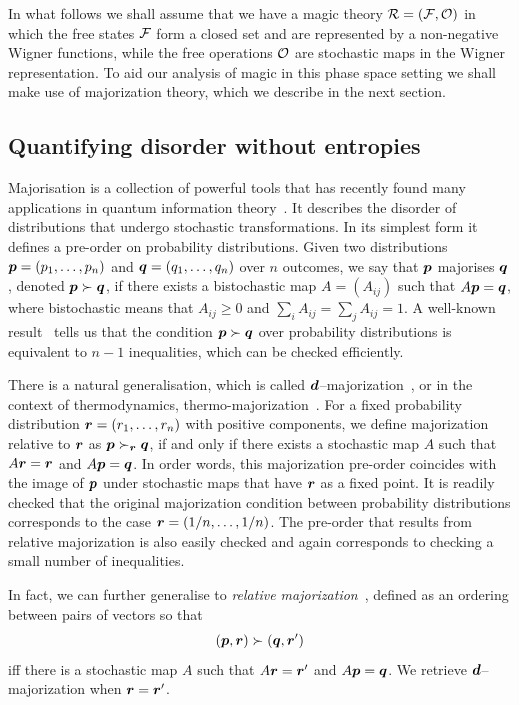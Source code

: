 \documentclass[pra,
aps,
twocolumn,
superscriptaddress,
groupedaddress,
nofootinbib,
reprint
]{revtex4-1}
\begin{document}
In what follows we shall assume that we have a magic theory ${\mathcal R} = ({\mathcal F}, {\mathcal O})$ in which the free states ${\mathcal F}$ form a closed set and are represented by a non-negative Wigner functions, while the free operations ${\mathcal O}$ are stochastic maps in the Wigner representation. To aid our analysis of magic in this phase space setting we shall make use of majorization theory, which we describe in the next section.



\subsection{Quantifying disorder without entropies}
\label{sec:major}

Majorisation is a collection of powerful tools that has recently found many applications in quantum information theory~\cite{Nielsen_1999, cit:cwiklinski, cit:lostaglio2, cit:gour, cit:gour2, Horodecki_2003, Vallejos_2021}.
It describes the disorder of distributions that undergo stochastic transformations. In its simplest form it defines a pre-order on probability distributions. Given two distributions $\boldsymbol{p}= (p_1, \dots, p_n)$ and $\boldsymbol{q} = (q_1, \dots, q_n)$ over $n$ outcomes, we say that $\boldsymbol{p}$ majorises $\boldsymbol{q}$, denoted $\boldsymbol{p} \succ \boldsymbol{q}$, if there exists a bistochastic map $A = (A_{ij})$ such that $A\boldsymbol{p} = \boldsymbol{q}$, where bistochastic means that $A_{ij} \geq 0$ and $\sum_i A_{ij} = \sum_j A_{ij} = 1$. A well-known result~\cite{cit:marshall} tells us that the condition $ \boldsymbol{p} \succ \boldsymbol{q}$ over probability distributions is equivalent to $n-1$ inequalities, which can be checked efficiently.

There is a natural generalisation, which is called $\bm{d}$--majorization~\cite{Veinott_1971}, or in the context of thermodynamics, thermo-majorization~\cite{cit:horodecki2013}. For a fixed probability distribution $\boldsymbol{r} = (r_1, \dots, r_n)$ with positive components, we define majorization relative to $\boldsymbol{r}$ as $\boldsymbol{p} \succ_{\boldsymbol{r}} \boldsymbol{q}$, if and only if there exists a stochastic map $A$ such that $A\boldsymbol{r} = \boldsymbol{r}$ and $A \boldsymbol{p} = \boldsymbol{q}$. In order words, this majorization pre-order coincides with the image of $\boldsymbol{p}$ under stochastic maps that have $\boldsymbol{r}$ as a fixed point. It is readily checked that the original majorization condition between probability distributions corresponds to the case $\boldsymbol{r} = (1/n, \dots, 1/n)$. The pre-order that results from relative majorization is also easily checked and again corresponds to checking a small number of inequalities.

In fact, we can further generalise to \emph{relative majorization}~\cite{Ruch_1976, ruch_mixing_1978, Renes_2016, Buscemi_2017}, defined as an ordering between pairs of vectors so that 
\begin{equation}
	(\boldsymbol{p},\boldsymbol{r}) \succ (\boldsymbol{q}, \boldsymbol{r}')
\end{equation}
iff there is a stochastic map $A$ such that $A\boldsymbol{r} = \boldsymbol{r}'$ and $A\boldsymbol{p} = \boldsymbol{q}$. We retrieve $\bm{d}$--majorization when $\boldsymbol{r} = \boldsymbol{r}'$.
\end{document}
